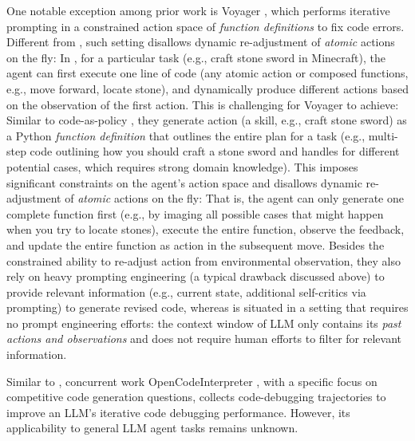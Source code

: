 One notable exception among prior work is Voyager \citep{wang2023voyager}, which performs iterative prompting in a constrained action space of \textit{function definitions} to fix code errors.
% 
Different from \approach, such setting disallows dynamic re-adjustment of \textit{atomic} actions on the fly: In \approach, for a particular task (e.g., craft stone sword in Minecraft), the agent can first execute one line of code (any atomic action or composed functions, e.g., move forward, locate stone), and dynamically produce different actions based on the observation of the first action.
% 
This is challenging for Voyager to achieve: Similar to code-as-policy \citep{codeaspolicies2022}, they generate action (a skill, e.g., craft stone sword) as a Python \textit{function definition} that outlines the entire plan for a task (e.g., multi-step code outlining how you should craft a stone sword and handles for different potential cases, which requires strong domain knowledge).
% 
This imposes significant constraints on the agent's action space and disallows dynamic re-adjustment of \textit{atomic} actions on the fly: That is, the agent can only generate one complete function first (e.g., by imaging all possible cases that might happen when you try to locate stones), execute the entire function, observe the feedback, and update the entire function as action in the subsequent move.
% 
Besides the constrained ability to re-adjust action from environmental observation, they also rely on heavy prompting engineering (a typical drawback discussed above) to provide relevant information (e.g., current state, additional self-critics via prompting) to generate revised code, whereas \approach is situated in a setting that requires no prompt engineering efforts: the context window of LLM only contains its \textit{past actions and observations} and does not require human efforts to filter for relevant information.

Similar to \approach, concurrent work OpenCodeInterpreter \citep{opencodeinterpreter}, with a specific focus on competitive code generation questions, collects code-debugging trajectories to improve an LLM's iterative code debugging performance. However, its applicability to general LLM agent tasks remains unknown.



